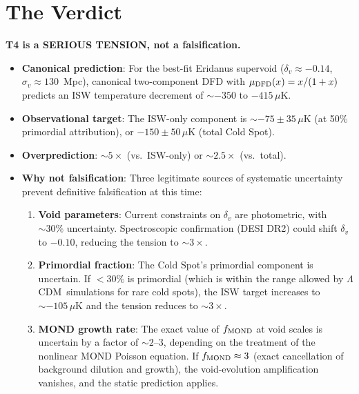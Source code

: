 \documentclass[11pt,a4paper]{article}
\newcommand{\LCDM}{$\Lambda$CDM}
\newcommand{\mufd}{\mu_{\rm DFD}}
\begin{document}
\section{The Verdict}

\begin{tcolorbox}[colback=orange!5!white, colframe=red!60!black,
  title=\textbf{DEFINITIVE T4 ASSESSMENT}]

\textbf{T4 is a SERIOUS TENSION, not a falsification.}

\begin{itemize}
\item \textbf{Canonical prediction}: For the best-fit Eridanus
  supervoid ($\delta_v \approx -0.14$, $\sigma_v \approx 130$~Mpc),
  canonical two-component DFD with $\mufd(x) = x/(1+x)$ predicts
  an ISW temperature decrement of $\sim -350$ to $-415\,\mu$K.

\item \textbf{Observational target}: The ISW-only component is
  $\sim -75 \pm 35\,\mu$K (at 50\% primordial attribution),
  or $-150 \pm 50\,\mu$K (total Cold Spot).

\item \textbf{Overprediction}: $\sim 5\times$ (vs.\ ISW-only) or
  $\sim 2.5\times$ (vs.\ total).

\item \textbf{Why not falsification}: Three legitimate sources of
  systematic uncertainty prevent definitive falsification at this time:

  \begin{enumerate}
  \item \textbf{Void parameters}: Current constraints on $\delta_v$
    are photometric, with $\sim 30\%$ uncertainty. Spectroscopic
    confirmation (DESI DR2) could shift $\delta_v$ to $-0.10$, reducing
    the tension to $\sim 3\times$.

  \item \textbf{Primordial fraction}: The Cold Spot's primordial
    component is uncertain. If $<30\%$ is primordial (which is within
    the range allowed by \LCDM\ simulations for rare cold spots), the
    ISW target increases to $\sim -105\,\mu$K and the tension reduces
    to $\sim 3\times$.

  \item \textbf{MOND growth rate}: The exact value of $f_{\rm MOND}$
    at void scales is uncertain by a factor of $\sim 2$--$3$,
    depending on the treatment of the nonlinear MOND Poisson equation.
    If $f_{\rm MOND} \approx 3$ (exact cancellation of background
    dilution and growth), the void-evolution amplification vanishes,
    and the static prediction applies.
  \end{enumerate}


\end{itemize}
\end{tcolorbox}
\end{document}

